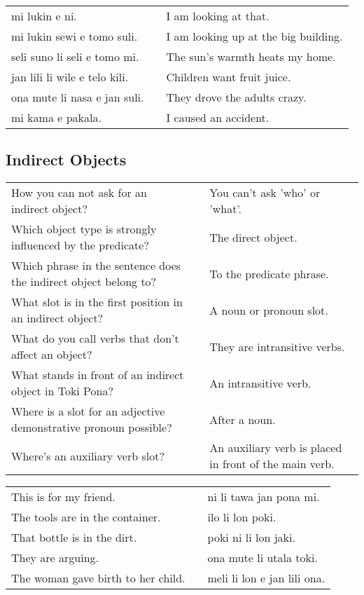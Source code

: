 \begin{supertabular}{p{5,5cm}|ll}
mi lukin e ni. && I am looking at that. \\ 
mi lukin sewi e tomo suli.  && I am looking up at the big building. \\
seli suno li seli e tomo mi.  && The sun's warmth heats my home.  \\
jan lili li wile e telo kili.  && Children want fruit juice. \\
ona mute li nasa e jan suli.  && They drove the adults crazy. \\
mi kama e pakala. && I caused an accident. \\
\end{supertabular} 

\newpage
%
\subsection*{Indirect Objects} 
\label{'indirect_objects'}
%
\begin{supertabular}{p{5,5cm}|ll}
How you can not ask for an indirect object? && You can't ask 'who' or 'what'. \\ %
Which object type is strongly influenced by the predicate? && The direct object.  \\ %
Which phrase in the sentence does the indirect object belong to? && To the predicate phrase. \\ %
What slot is in the first position in an indirect object? && A noun or pronoun slot. \\ %
What do you call verbs that don't affect an object? && They are intransitive verbs.  \\ %
What stands in front of an indirect object in Toki Pona? && An intransitive verb. \\ %
Where is a slot for an adjective demonstrative pronoun possible? && After a noun. \\ %
Where's an auxiliary verb slot? && An auxiliary verb is placed in front of the main verb. \\ %
\end{supertabular}

\begin{supertabular}{p{5,5cm}|ll}
This is for my friend.  && ni li tawa jan pona mi. \\ %
The tools are in the container.  && ilo li lon poki. \\ %
That bottle is in the dirt.  && poki ni li lon jaki. \\ %
They are arguing. && ona mute li utala toki. \\ %
The woman gave birth to her child. && meli li lon e jan lili ona. \\ %
\end{supertabular} 

